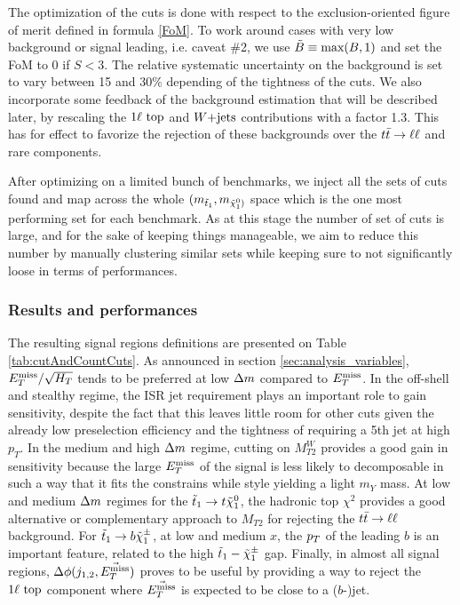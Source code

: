    The optimization of the cuts is done with respect to the exclusion-oriented figure of 
    merit defined in formula \ref{FoM}. To work around cases with very low background or signal leading,
    i.e. caveat \#2, we use $\tilde{B} \equiv \text{max}(B,1)$ and set the FoM to 0
    if $S < 3$. The relative systematic uncertainty on the background is set to vary between
    15 and 30\% depending of the tightness of the cuts. We also incorporate some feedback
    of the background estimation that will be described later, by rescaling the $1\ell~\text{top}$
    and $\text{$W$+jets}$ contributions with a factor 1.3. This has for effect to favorize the
    rejection of these backgrounds over the $t\bar{t} \rightarrow \ell \ell$ and rare components.

    After optimizing on a limited bunch of benchmarks, we inject all the sets of cuts found
    and map across the whole $(m_{\tilde{t}_1},m_{\tilde{\chi}_1^0)}$ space which is the one
    most performing set for each benchmark. As at this stage the number of set of cuts is 
    large, and for the sake of keeping things manageable, we aim to reduce this number by 
    manually clustering similar sets while keeping sure to not significantly loose in 
    terms of performances. 

            \subsubsection{Results and performances}

    The resulting signal regions definitions are presented on Table \ref{tab:cutAndCountCuts}.
    As announced in section \ref{sec:analysis_variables}, $E_T^\text{miss}/\sqrt{H_T}$ tends to be
    preferred at low $\Delta m$ compared to $E_T^\text{miss}$. In the off-shell and stealthy regime, 
    the ISR jet requirement plays an important role to gain sensitivity, despite the
    fact that this leaves little room for other cuts given the already low preselection
    efficiency and the tightness of requiring a 5th jet at high $p_T$.
    In the medium and high $\Delta m$ regime, cutting on $M_{T2}^W$ provides a good gain 
    in sensitivity because the large $E_T^\text{miss}$ of the signal is less likely to decomposable 
    in such a way that it fits the constrains while style yielding a light $m_Y$ mass. 
    At low and medium $\Delta m$ regimes for the $\tilde{t}_1 \rightarrow t \tilde{\chi}_1^0$, the 
    hadronic top $\chi^2$ provides a good alternative or complementary approach to $M_{T2}$ 
    for rejecting the $t\bar{t} \rightarrow \ell \ell$ background. For $\tilde{t}_1 \rightarrow b \tilde{\chi}_1^\pm$, 
    at low and medium $x$, the $p_T$ of the leading $b$ is an important feature, related 
    to the high $\tilde{t}_1-\tilde{\chi}_1^\pm$ gap. Finally, in almost all signal regions,
    $\Delta\phi(j_{1,2},\vec{E_T^\text{miss}})$ proves to be useful by providing a way to reject the 
    $1\ell~\text{top}$ component where $\vec{E_T^\text{miss}}$ is expected to be close to a ($b$-)jet. 

